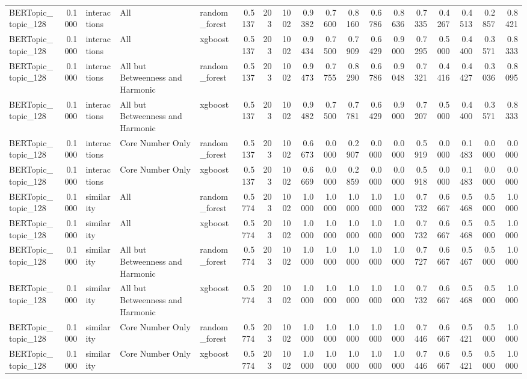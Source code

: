 \begin{tabular}{lrlllrrrrrrrrrrrrr}
BERTopic_topic_128 & 0.1000 & interactions & All & random_forest & 0.5137 & 203 & 1002 & 0.9382 & 0.7600 & 0.8160 & 0.6786 & 0.8636 & 0.7335 & 0.4267 & 0.4513 & 0.2857 & 0.8421 \\
BERTopic_topic_128 & 0.1000 & interactions & All & xgboost & 0.5137 & 203 & 1002 & 0.9434 & 0.7500 & 0.7909 & 0.6429 & 0.9000 & 0.7295 & 0.5000 & 0.4400 & 0.3571 & 0.8333 \\
BERTopic_topic_128 & 0.1000 & interactions & All but Betweenness and Harmonic & random_forest & 0.5137 & 203 & 1002 & 0.9473 & 0.7755 & 0.8290 & 0.6786 & 0.9048 & 0.7321 & 0.4416 & 0.4427 & 0.3036 & 0.8095 \\
BERTopic_topic_128 & 0.1000 & interactions & All but Betweenness and Harmonic & xgboost & 0.5137 & 203 & 1002 & 0.9482 & 0.7500 & 0.7781 & 0.6429 & 0.9000 & 0.7207 & 0.5000 & 0.4400 & 0.3571 & 0.8333 \\
BERTopic_topic_128 & 0.1000 & interactions & Core Number Only & random_forest & 0.5137 & 203 & 1002 & 0.6673 & 0.0000 & 0.2907 & 0.0000 & 0.0000 & 0.5919 & 0.0000 & 0.1483 & 0.0000 & 0.0000 \\
BERTopic_topic_128 & 0.1000 & interactions & Core Number Only & xgboost & 0.5137 & 203 & 1002 & 0.6669 & 0.0000 & 0.2859 & 0.0000 & 0.0000 & 0.5918 & 0.0000 & 0.1483 & 0.0000 & 0.0000 \\
BERTopic_topic_128 & 0.1000 & similarity & All & random_forest & 0.5774 & 203 & 1002 & 1.0000 & 1.0000 & 1.0000 & 1.0000 & 1.0000 & 0.7732 & 0.6667 & 0.5468 & 0.5000 & 1.0000 \\
BERTopic_topic_128 & 0.1000 & similarity & All & xgboost & 0.5774 & 203 & 1002 & 1.0000 & 1.0000 & 1.0000 & 1.0000 & 1.0000 & 0.7732 & 0.6667 & 0.5468 & 0.5000 & 1.0000 \\
BERTopic_topic_128 & 0.1000 & similarity & All but Betweenness and Harmonic & random_forest & 0.5774 & 203 & 1002 & 1.0000 & 1.0000 & 1.0000 & 1.0000 & 1.0000 & 0.7727 & 0.6667 & 0.5467 & 0.5000 & 1.0000 \\
BERTopic_topic_128 & 0.1000 & similarity & All but Betweenness and Harmonic & xgboost & 0.5774 & 203 & 1002 & 1.0000 & 1.0000 & 1.0000 & 1.0000 & 1.0000 & 0.7732 & 0.6667 & 0.5468 & 0.5000 & 1.0000 \\
BERTopic_topic_128 & 0.1000 & similarity & Core Number Only & random_forest & 0.5774 & 203 & 1002 & 1.0000 & 1.0000 & 1.0000 & 1.0000 & 1.0000 & 0.7446 & 0.6667 & 0.5421 & 0.5000 & 1.0000 \\
BERTopic_topic_128 & 0.1000 & similarity & Core Number Only & xgboost & 0.5774 & 203 & 1002 & 1.0000 & 1.0000 & 1.0000 & 1.0000 & 1.0000 & 0.7446 & 0.6667 & 0.5421 & 0.5000 & 1.0000 \\

\end{tabular}

